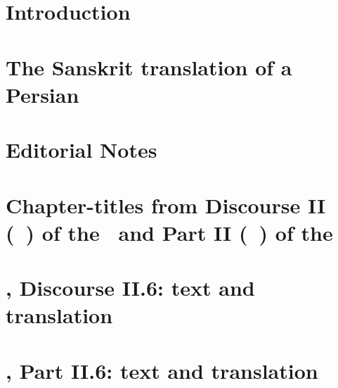 \documentclass[10pt, a4paper, oneside]{memoir}
\begin{document}
\section{Introduction}\label{introduction}

 \clearpage

\section{The Sanskrit translation of a Persian \zij} \label{sanskrit_translation_of_persian_zij}

\clearpage

\section{Editorial Notes}\label{editoial_notes}

\clearpage

\section[Chapter-titles from the \ZijiShahJahani, Discourse~II and the\linebreak \Siddhantasindhu, Part~II: text and translation]{Chapter-titles from Discourse II (\maqala\idafaconsonant\ \duvum) of the \ZijiShahJahani\ and Part II (\dvitiya\ \kanda) of the \Siddhantasindhu}\label{chapter_title_comparision_persian_sanskrit}

\clearpage

\section{\ZijiShahJahani, Discourse II.6: text and translation}
\label{zijshahjahan_persian_english}

\clearpage
% 
% 

\section{\Siddhantasindhu, Part II.6: text and translation}
\label{siddhantasindhu_sanskrit_english}

\clearpage
% 
% 


\renewcommand{\thefootnote}{\arabic{footnote}}
\setcounter{footnote}{0}
\setlength{\footnotesep}{\onelineskip} %

\clearpage
\end{document}
